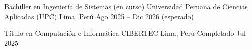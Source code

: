 

\begin{cventries}

  \cventry
    {Bachiller en Ingeniería de Sistemas (en curso)} %
    {Universidad Peruana de Ciencias Aplicadas (UPC)} %
    {Lima, Perú} %
  {Ago 2025 -- Dic 2026 (esperado)} %
  {}

  \vspace{0.8em}

  \cventry
    {Título en Computación e Informática} %
    {CIBERTEC} %
    {Lima, Perú} %
    {Completado Jul 2025} %
    {}

\end{cventries}
